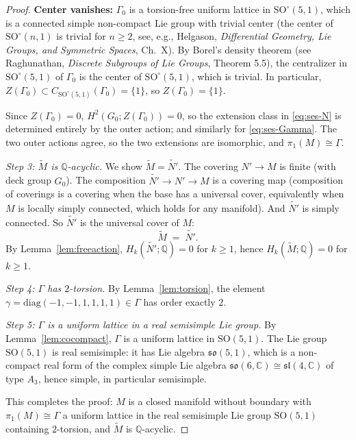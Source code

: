 \documentclass[12pt]{article}
\theoremstyle{definition}
\begin{document}
\begin{proof}
\textbf{Center vanishes:} $\Gamma_0$ is a torsion-free uniform lattice in $\mathrm{SO}^\circ(5,1)$, which is a connected simple non-compact Lie group with trivial center (the center of $\mathrm{SO}^\circ(n,1)$ is trivial for $n\geq 2$, see, e.g., Helgason, \emph{Differential Geometry, Lie Groups, and Symmetric Spaces}, Ch.~X). By Borel's density theorem (see Raghunathan, \emph{Discrete Subgroups of Lie Groups}, Theorem 5.5), the centralizer in $\mathrm{SO}^\circ(5,1)$ of $\Gamma_0$ is the center of $\mathrm{SO}^\circ(5,1)$, which is trivial. In particular, $Z(\Gamma_0)\subset C_{\mathrm{SO}^\circ(5,1)}(\Gamma_0)=\{1\}$, so $Z(\Gamma_0)=\{1\}$.

Since $Z(\Gamma_0)=0$, $H^2(G_0;Z(\Gamma_0))=0$, so the extension class in \eqref{eq:ses-N} is determined entirely by the outer action; and similarly for \eqref{eq:ses-Gamma}. The two outer actions agree, so the two extensions are isomorphic, and $\pi_1(M)\cong\Gamma$.

\medskip

\noindent\emph{Step 3: $\widetilde{M}$ is $\mathbb{Q}$-acyclic.} We show $\widetilde{M}=\widetilde{N'}$. The covering $N'\to M$ is finite (with deck group $G_0$). The composition $\widetilde{N'}\to N'\to M$ is a covering map (composition of coverings is a covering when the base has a universal cover, equivalently when $M$ is locally simply connected, which holds for any manifold). And $\widetilde{N'}$ is simply connected. So $\widetilde{N'}$ is the universal cover of $M$:
\[
\widetilde{M} \;=\; \widetilde{N'}.
\]
By Lemma~\ref{lem:freeaction}, $H_k(\widetilde{N'};\mathbb{Q})=0$ for $k\geq 1$, hence $H_k(\widetilde{M};\mathbb{Q})=0$ for $k\geq 1$.

\medskip

\noindent\emph{Step 4: $\Gamma$ has $2$-torsion.} By Lemma~\ref{lem:torsion}, the element $\gamma=\mathrm{diag}(-1,-1,1,1,1,1)\in\Gamma$ has order exactly $2$.

\medskip

\noindent\emph{Step 5: $\Gamma$ is a uniform lattice in a real semisimple Lie group.} By Lemma~\ref{lem:cocompact}, $\Gamma$ is a uniform lattice in $\mathrm{SO}(5,1)$. The Lie group $\mathrm{SO}(5,1)$ is real semisimple: it has Lie algebra $\mathfrak{so}(5,1)$, which is a non-compact real form of the complex simple Lie algebra $\mathfrak{so}(6,\mathbb{C})\cong\mathfrak{sl}(4,\mathbb{C})$ of type $A_3$, hence simple, in particular semisimple.

\medskip

This completes the proof: $M$ is a closed manifold without boundary with $\pi_1(M)\cong\Gamma$ a uniform lattice in the real semisimple Lie group $\mathrm{SO}(5,1)$ containing $2$-torsion, and $\widetilde{M}$ is $\mathbb{Q}$-acyclic.
\end{proof}
\end{document}
